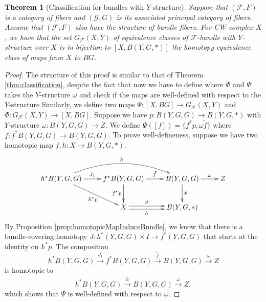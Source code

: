 \documentclass[psamsfonts]{amsart}
\newtheorem{thm}{Theorem}[section]
\theoremstyle{definition}
\theoremstyle{remark}
\numberwithin{equation}{section}
\begin{document}
\begin{thm} [Classification for bundles with $Y$-structure]
\label{thm:Yclassification}
Suppose that $(\mathcal{F}, F)$ is a category of fibers and $(\mathcal{G}, G)$ is its associated principal category of fibers. Assume that $(\mathcal{F}, F)$ also have the structure of bundle fibers. For CW-complex $X$, we have that the set $G_{\mathcal{F}}(X, Y)$ of equivalence classes of $\mathcal{F}$-bundle with $Y$-structure over $X$ is in bijection to $[X, B(Y, G, *)]$ the homotopy equivalence class of maps from $X$ to $BG$.
\end{thm}

\begin{proof}
The structure of this proof is similar to that of Theorem \ref{thm:classification}, despite the fact that now we have to define where $\Phi$ and $\Psi$ takes the $Y$-structure $\omega$ and check if the maps are well-defined with respect to the $Y$-structure Similarly, we define two maps $\Psi: [X, BG] \rightarrow G_{\mathcal{F}}(X, Y)$ and $\Phi: G_{\mathcal{F}}(X, Y) \rightarrow [X, BG]$. Suppose we have $p: B(Y, G, G) \rightarrow B(Y, G, *)$ with $Y$-structure $\omega: B(Y, G, G) \to Z$. We define $\Psi([f]) = \{f^{*}p, \omega\tilde{f}\}$ where $\tilde{f}: f^{*}B(Y, G, G) \to B(Y, G, G)$. To prove well-defineness, suppose we have two homotopic map $f, h: X \to B(Y, G, *).$
\[\xymatrix{
h^{*}B(Y, G, G) \ar[dr]_-{h^{*}p} \ar[r]^-{J_{1}} \ar@/^5ex/[rr]^-{\tilde{h}} & f^{*}B(Y, G, G) \ar[d]_{f^{*}p} \ar[r]^-{\tilde{f}} & B(Y, G, G)\ar[d]^{p} \ar[r]^-{\omega}& Z\\
& X \ar[r]<.5ex>^-{g} \ar[r]<-.5ex>_-{h} & B(Y, G, *) \\} \]
By Proposition \ref{prop:homotopicMapInduceBundle}, we know that there is a bundle-covering homotopy $J: h^{*}(Y, G, G) \times I \to f^{*}(Y, G, G)$ that starts at the identity on $h^{*}p$. The composition
$$ h^{*}B(Y, G, G) \xrightarrow{J_{1}} f^{*}B(Y, G, G) \xrightarrow{\tilde{f}}  B(Y, G, G) \xrightarrow{\omega} Z $$
is homotopic to $$ h^{*}B(Y, G, G) \xrightarrow{\tilde{h}} B(Y, G, G) \xrightarrow{\omega} Z,$$ which shows that $\Psi$ is well-defined with respect to $\omega$.
 

\end{proof}
\end{document}
